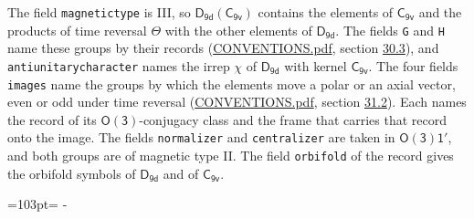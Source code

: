 \documentclass[10pt,a4paper]{article}
\newcommand{\needspace}[1]{\par\penalty-100\begingroup\dimen0=#1\relax\dimen2=\pagegoal
  \advance\dimen2-\pagetotal\ifdim\dimen0>\dimen2\relax\ifdim\dimen2>0pt\vfil\break\fi\fi
  \endgroup}
\numberwithin{equation}{section}
\newcommand{\grp}[1]{\mathsf{#1}}
\begin{document}
The field \texttt{magnetictype} is III, so $\grp{D_{9d}}(\grp{C_{9v}})$ contains the elements of $\grp{C_{9v}}$ and the products of time reversal $\varTheta$ with the other elements of $\grp{D_{9d}}$. The fields \texttt{G} and \texttt{H} name these groups by their records (\href{../../CONVENTIONS.pdf}{CONVENTIONS.pdf}, section \href{../../CONVENTIONS.pdf\#conv.30.3}{30.3}), and \texttt{antiunitarycharacter} names the irrep $\chi$ of $\grp{D_{9d}}$ with kernel $\grp{C_{9v}}$. The four fields \texttt{images} name the groups by which the elements move a polar or an axial vector, even or odd under time reversal (\href{../../CONVENTIONS.pdf}{CONVENTIONS.pdf}, section \href{../../CONVENTIONS.pdf\#conv.31.2}{31.2}). Each names the record of its $\grp{O(3)}$-conjugacy class and the frame that carries that record onto the image. The fields \texttt{normalizer} and \texttt{centralizer} are taken in $\grp{O(3)1'}$, and both groups are of magnetic type II. The field \texttt{orbifold} of the record gives the orbifold symbols of $\grp{D_{9d}}$ and of $\grp{C_{9v}}$.
\needspace{103pt}
\end{document}
